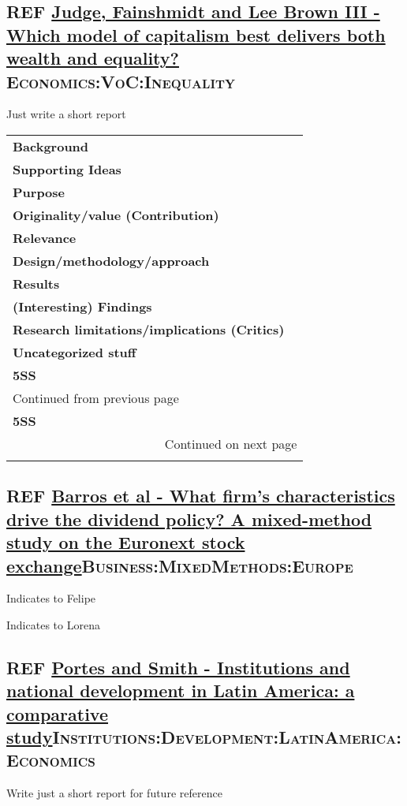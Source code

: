 \documentclass[11pt]{article}
\begin{document}
\subsection*{{\bfseries\sffamily REF} \href{https://doi.org/10.1057/jibs.2014.13}{Judge, Fainshmidt and Lee Brown III -  Which model of capitalism best delivers both wealth and equality?}\hfill{}\textsc{Economics:VoC:Inequality}}
\label{sec:orga2612ad}
Just write a short report

\begin{longtable}{l|p{}}
\hline
\hline
\textbf{Background} & \\
\textbf{Supporting Ideas} & \\
\textbf{Purpose} & \\
\textbf{Originality/value (Contribution)} & \\
\textbf{Relevance} & \\
\textbf{Design/methodology/approach} & \\
\textbf{Results} & \\
\textbf{(Interesting) Findings} & \\
\textbf{Research limitations/implications (Critics)} & \\
\textbf{Uncategorized stuff} & \\
\textbf{5SS} & \\
\hline
\endfirsthead
\multicolumn{2}{l}{Continued from previous page} \\

\textbf{5SS} &  \\

\hline
\endhead
\hline\multicolumn{2}{r}{Continued on next page} \\
\endfoot
\endlastfoot
\hline
\hline
\end{longtable}


\subsection*{{\bfseries\sffamily REF} \href{https://doi.org/10.1016/j.jbusres.2019.11.042}{Barros et al - What firm’s characteristics drive the dividend policy? A mixed-method study on the Euronext stock exchange}\hfill{}\textsc{Business:MixedMethods:Europe}}
\label{sec:org6a64afb}
Indicates to Felipe

Indicates to Lorena

\subsection*{{\bfseries\sffamily REF} \href{https://doi.org/10.1093/ser/mwq018}{Portes and Smith - Institutions and national development in Latin America: a comparative study}\hfill{}\textsc{Institutions:Development:LatinAmerica:Economics}}
\label{sec:orgd0b3f48}
Write just a short report for future reference
\end{document}
